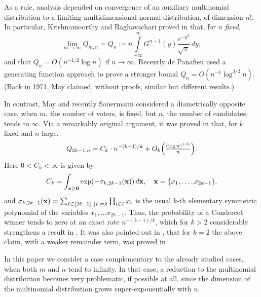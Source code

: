 \documentclass[11pt]{amsart}
\theoremstyle{remark}
\numberwithin{equation}{section}
\begin{document}
As a rule, analysis depended on convergence of an auxiliary multinomial distribution to a limiting multidimensional normal distribution,
of dimension $n!$. 
In particular, Krishnamoorthy and Raghavachari proved in \cite{KrR} that, for $n$ {\it fixed\/},
\begin{equation}\label{0.9}
\lim_{m\to\infty}Q_{m,n}=Q_n:=n\int\limits_{-\infty}^{\infty}\!\!G^{n-1}(y)\frac{e^{-y^2}}{\sqrt{\pi}}\,dy,
\end{equation}
and that $Q_n=O(n^{-1/2}\log n)$ if $n\to\infty$. Recently de Panafieu \cite{Eli} used a generating function approach to prove a stronger 
bound $Q_n=O(n^{-1}\log^{3/2} n)$. (Back in 1971, May \cite{May} claimed, without proofs, similar but different results.)
 
In contrast,  May \cite{May} and recently Sauermann \cite{Sau} considered a diametrically opposite case, when $m$, the number of voters, is fixed, but $n$, the number of candidates, tends to $\infty$. 
Via a remarkably original argument, it was proved in \cite{Sau} that, for $k$ fixed and $n$ large, 
\begin{equation}\label{1}
Q_{2k-1,n}=C_k\cdot n^{-(k-1)/k}+O_k\Bigl(\tfrac{(\log n)^{1/k}}{n}\Bigr).
\end{equation}
Here $0<C_k<\infty$ is given by
\begin{equation}\label{2}
C_k=\int_{\bold x\ge \bold 0} \exp(-\sigma_{k,2k-1}(\bold x))\,d\bold x,\quad \bold x=\{x_1,\dots, x_{2k-1}\},
\end{equation}
and $\sigma_{k,2k-1}(\bold x)=\sum_{I\subset [2k-1],\,|I|=k}\prod_{i\in I} x_i$ is the usual $k$-th elementary symmetric polynomial of the variables $x_1,\dots x_{2k-1}$. %
Thus, the probability of a Condercet winner tends to zero at an exact rate $n^{-(k-1)/k}$, which for $k>2$ considerably strengthens a result  in \cite{May}.  
It was also pointed out in \cite {Sau}, that for $k=2$ the above claim, with a weaker remainder term, was proved in  
\cite{May}.

In this paper we consider a case complementary to the already studied cases, when both $m$ and $n$ tend to infinity. In that case, a reduction to the multinomial distribution becomes very problematic, if possible at all, since the dimension of the multinomial distribution grows super-exponentially with $n$. 
\end{document}
